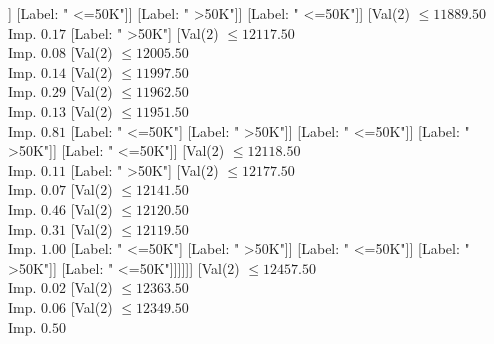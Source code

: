\documentclass[margin=10pt]{standalone}
\begin{document}
\begin{forest}
																											[Val($2$) $ \leq 11779.50$ \\ Imp. $0.25$
																												[Val($2$) $ \leq 11649.50$ \\ Imp. $0.14$
																													[Val($2$) $ \leq 11640.50$ \\ Imp. $0.81$
																														[Label: " <=50K"]
																														[Label: " >50K"]]
																													[Label: " <=50K"]]
																												[Label: " >50K"]]
																											[Label: " <=50K"]]
																										[Val($2$) $ \leq 11889.50$ \\ Imp. $0.17$
																											[Label: " >50K"]
																											[Val($2$) $ \leq 12117.50$ \\ Imp. $0.08$
																												[Val($2$) $ \leq 12005.50$ \\ Imp. $0.14$
																													[Val($2$) $ \leq 11997.50$ \\ Imp. $0.29$
																														[Val($2$) $ \leq 11962.50$ \\ Imp. $0.13$
																															[Val($2$) $ \leq 11951.50$ \\ Imp. $0.81$
																																[Label: " <=50K"]
																																[Label: " >50K"]]
																															[Label: " <=50K"]]
																														[Label: " >50K"]]
																													[Label: " <=50K"]]
																												[Val($2$) $ \leq 12118.50$ \\ Imp. $0.11$
																													[Label: " >50K"]
																													[Val($2$) $ \leq 12177.50$ \\ Imp. $0.07$
																														[Val($2$) $ \leq 12141.50$ \\ Imp. $0.46$
																															[Val($2$) $ \leq 12120.50$ \\ Imp. $0.31$
																																[Val($2$) $ \leq 12119.50$ \\ Imp. $1.00$
																																	[Label: " <=50K"]
																																	[Label: " >50K"]]
																																[Label: " <=50K"]]
																															[Label: " >50K"]]
																														[Label: " <=50K"]]]]]]
																									[Val($2$) $ \leq 12457.50$ \\ Imp. $0.02$
																										[Val($2$) $ \leq 12363.50$ \\ Imp. $0.06$
																											[Val($2$) $ \leq 12349.50$ \\ Imp. $0.50$

\end{forest}
\end{document}

